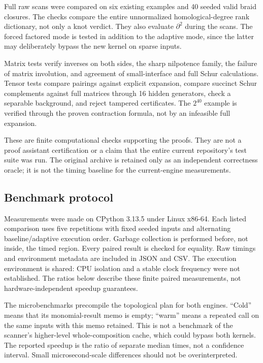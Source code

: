 \documentclass[11pt]{article}
\theoremstyle{definition}\newtheorem{definition}[theorem]{Definition}
\theoremstyle{remark}\newtheorem{remark}[theorem]{Remark}
\begin{document}
Full raw scans were compared on six existing examples and 40 seeded valid braid closures. The checks compare the entire unnormalized homological-degree rank dictionary, not only a knot verdict. They also evaluate $\partial^2$ during the scans. The forced factored mode is tested in addition to the adaptive mode, since the latter may deliberately bypass the new kernel on sparse inputs.

Matrix tests verify inverses on both sides, the sharp nilpotence family, the failure of matrix involution, and agreement of small-interface and full Schur calculations. Tensor tests compare pairings against explicit expansion, compare succinct Schur complements against full matrices through 16 hidden generators, check a separable background, and reject tampered certificates. The $2^{40}$ example is verified through the proven contraction formula, not by an infeasible full expansion.

These are finite computational checks supporting the proofs. They are not a proof assistant certification or a claim that the entire current repository's test suite was run. The original archive is retained only as an independent correctness oracle; it is not the timing baseline for the current-engine measurements.

\subsection{Benchmark protocol}
Measurements were made on CPython 3.13.5 under Linux x86-64. Each listed comparison uses five repetitions with fixed seeded inputs and alternating baseline/adaptive execution order. Garbage collection is performed before, not inside, the timed region. Every paired result is checked for equality. Raw timings and environment metadata are included in JSON and CSV. The execution environment is shared: CPU isolation and a stable clock frequency were not established. The ratios below describe these finite paired measurements, not hardware-independent speedup guarantees.

The microbenchmarks precompile the topological plan for both engines. ``Cold'' means that its monomial-result memo is empty; ``warm'' means a repeated call on the same inputs with this memo retained. This is not a benchmark of the scanner's higher-level whole-composition cache, which could bypass both kernels. The reported speedup is the ratio of separate median times, not a confidence interval. Small microsecond-scale differences should not be overinterpreted.
\end{document}
